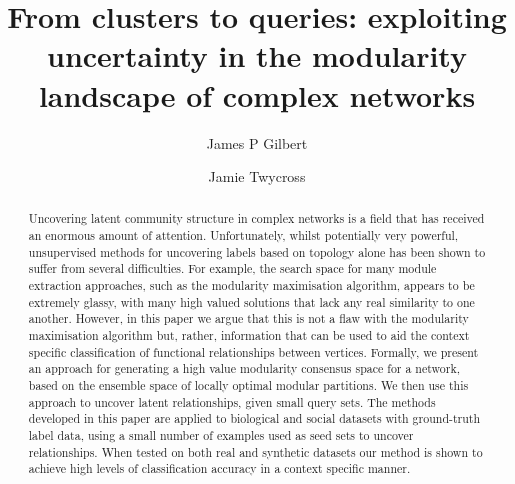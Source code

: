 \documentclass[sigconf]{acmart}
\begin{document}
\title[From clusters to queries]{From clusters to queries: exploiting uncertainty in the modularity landscape of complex networks}

\author{James P Gilbert}

\author{Jamie Twycross}

\begin{abstract}
Uncovering latent community structure in complex networks is a field that has received an enormous amount of attention.
Unfortunately, whilst potentially very powerful, unsupervised methods for uncovering labels based on topology alone has been shown to suffer from several difficulties.
For example, the search space for many module extraction approaches, such as the modularity maximisation algorithm, appears to be extremely glassy, with many high valued solutions that lack any real similarity to one another.
However, in this paper we argue that this is not a flaw with the modularity maximisation algorithm but, rather, information that can be used to aid the context specific classification of functional relationships between vertices.
Formally, we present an approach for generating a high value modularity consensus space for a network, based on the ensemble space of locally optimal modular partitions.
We then use this approach to uncover latent relationships, given small query sets.
The methods developed in this paper are applied to biological and social datasets with ground-truth label data, using a small number of examples used as seed sets to uncover relationships.
When tested on both real and synthetic datasets our method is shown to achieve high levels of classification accuracy in a context specific manner.
\end{abstract}

\maketitle
\end{document}

